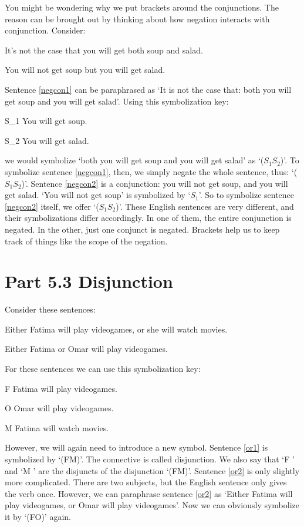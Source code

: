 
You might be wondering why we put brackets around the conjunctions. The reason can be brought out by thinking about how negation interacts with conjunction. Consider:
	\begin{earg}
		\item[\ex{negcon1}] It's not the case that you will get both soup and salad.
		\item[\ex{negcon2}] You will not get soup but you will get salad.
	\end{earg}
Sentence \ref{negcon1} can be paraphrased as ‘It is not the case that: both you will get soup and you will get salad’. Using this symbolization key:
	\begin{ekey}
		\item[S_1] You will get soup.
		\item[S_2] You will get salad.
	\end{ekey}
we would symbolize ‘both you will get soup and you will get salad’ as ‘($S_1$\eand $S_2$)’. To symbolize sentence  \ref{negcon1}, then, we simply negate the whole sentence, thus: ‘\enot ($S_1$\eand $S_2$)’.
Sentence \ref{negcon2} is a conjunction: you will not get soup, and you will get salad. ‘You will not get soup’ is symbolized by ‘\enot $S_1$’. So to symbolize sentence  \ref{negcon2} itself, we offer ‘(\enot $S_1$\eand $S_2$)’. These English sentences are very different, and their symbolizations differ accordingly. In one of them, the entire conjunction is negated. In the other, just one conjunct is negated. Brackets help us to keep track of things like the scope of the negation.
\section{Part 5.3 Disjunction}
\label{s:Part 5.3 Disjunction}
Consider these sentences:
	\begin{earg}
		\item[\ex{or1}]Either Fatima will play videogames, or she will watch movies.
		\item[\ex{or2}]Either Fatima or Omar will play videogames.
	\end{earg}
For these sentences we can use this symbolization key:
	\begin{ekey}
		\item[F] Fatima will play videogames.
		\item[O] Omar will play videogames.
		\item[M] Fatima will watch movies.
	\end{ekey}
However, we will again need to introduce a new symbol. Sentence \ref{or1} is symbolized by ‘(F\eor M)’. The connective is called \gls{disjunction}. We also say that ‘F ’ and ‘M ’ are the \glspl{disjunct} of the disjunction ‘(F\eor M)’.
Sentence \ref{or2} is only slightly more complicated. There are two subjects, but the English sentence only gives the verb once. However, we can paraphrase sentence \ref{or2} as ‘Either Fatima will play videogames, or Omar will play videogames’. Now we can obviously symbolize it by ‘(F\eor O)’ again.

